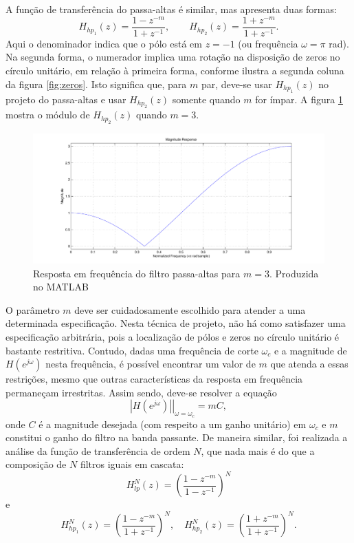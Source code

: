 A função de transferência do passa-altas é similar, mas apresenta duas formas:
\begin{equation}
     H_{hp_1}(z) = \frac{1-z^{-m}}{1+z^{-1}}, \quad \quad
     H_{hp_2}(z) = \frac{1+z^{-m}}{1+z^{-1}}.
     \label{equ:inthp}
\end{equation}
Aqui o denominador indica que o pólo está em $z=-1$ (ou frequência $\omega =\pi$ rad). Na segunda forma, o numerador implica uma rotação na disposição de zeros no círculo unitário, em relação à primeira forma, conforme ilustra a segunda coluna da figura \ref{fig:zeros}. Isto significa que, para $m$ par, deve-se usar $H_{hp_1}(z)$ no projeto do passa-altas e usar $H_{hp_2}(z)$ somente quando $m$ for ímpar. A figura \ref{fig:freqzhp} mostra o módulo de $H_{hp_2}(z)$ quando $m=3$.

\begin{figure}[ht!]
    \centering
    \includegraphics[width=500pt]{figures/chap3-freqz-hp.pdf}
    \caption[Resposta em frequência do filtro passa-altas para $m=3$]{Resposta em frequência do filtro passa-altas para $m=3$. Produzida no MATLAB}
    \label{fig:freqzhp}
\end{figure}

O parâmetro $m$ deve ser cuidadosamente escolhido para atender a uma determinada especificação. Nesta técnica de projeto, não há como satisfazer uma especificação arbitrária, pois a localização de pólos e zeros no círculo unitário é bastante restritiva. Contudo, dadas uma frequência de corte $\omega_c$ e a magnitude de $H(e^{j\omega})$ nesta frequência, é possível encontrar um valor de $m$ que atenda a essas restrições, mesmo que outras características da resposta em frequência permaneçam irrestritas. Assim sendo, deve-se resolver a equação
\begin{equation}
     \left.|H(e^{j\omega})|\right|_{\omega=\omega_c} = mC,
     \label{equ:solvem}
\end{equation}
onde $C$ é a magnitude desejada (com respeito a um ganho unitário) em $\omega_c$ e $m$ constitui o ganho do filtro na banda passante. De maneira similar, foi realizada a análise da função de transferência de ordem $N$, que nada mais é do que a composição de $N$ filtros iguais em cascata:
\begin{equation}
     H^N_{lp}(z) = \left(\frac{1-z^{-m}}{1-z^{-1}}\right)^N
\end{equation}
e
\begin{equation}
     H^N_{hp_1}(z) = \left(\frac{1-z^{-m}}{1+z^{-1}}\right)^N, \quad
     H^N_{hp_2}(z) = \left(\frac{1+z^{-m}}{1+z^{-1}}\right)^N.
\end{equation}

